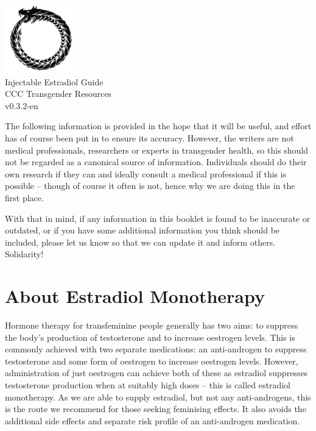 \documentclass[twoside,a5paper]{article}
\begin{document}
\begin{titlepage}
  \null\vspace{2em}
  \setcounter{page}{0}
  \begin{center}
    \includegraphics[width=8em]{ouroboros} \\
    \vspace{3em}
    {\LARGE Injectable Estradiol Guide \\}
    \vspace{2em}
    {\large CCC Transgender Resources \\}
    \vspace{0.6em}
    {\large v0.3.2-en \\}
  \end{center}
\end{titlepage}

\setcounter{page}{1}
\clearpage
\hfill
\clearpage

\tableofcontents
\listoftables
\listoffigures

\newpage
{}

\noindent The following information is provided in the hope that it
will be useful, and effort has of course been put in to ensure its
accuracy.  However, the writers are not medical professionals,
researchers or experts in transgender health, so this should not be
regarded as a canonical source of information.  Individuals should do
their own research if they can and ideally consult a medical
professional if this is possible -- though of course it often is not,
hence why we are doing this in the first place.

With that in mind, if any information in this booklet is found to be
inaccurate or outdated, or if you have some additional information
you think should be included, please let us know so that we can update
it and inform others.  Solidarity!

\section{About Estradiol Monotherapy}

Hormone therapy for transfeminine people generally has two aims: to
suppress the body's production of testosterone and to increase
oestrogen levels.  This is commonly achieved with two separate
medications: an anti-androgen to suppress testosterone and some form
of oestrogen to increase oestrogen levels.  However, administration of
just oestrogen can achieve both of these as estradiol suppresses
testosterone production when at suitably high doses -- this is called
estradiol monotherapy.  As we are able to supply estradiol, but not
any anti-androgens, this is the route we recommend for those seeking
feminising effects.  It also avoids the additional side effects and
separate risk profile of an anti-androgen medication.
\end{document}
